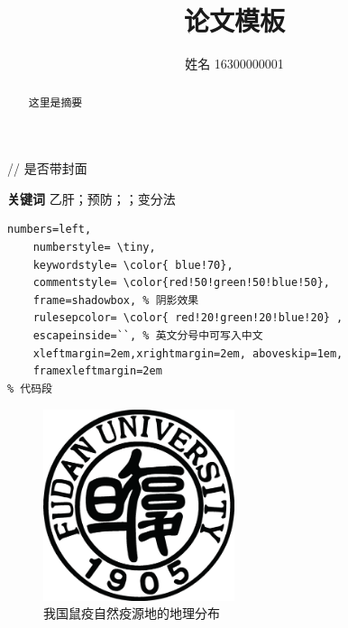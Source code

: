 \documentclass[UTF8,a4paper,12pt]{ctexart}%
\title{论文模板}
\author{姓名 16300000001}
\date{}
\begin{document}
	   // 是否带封面

\begin{abstract}
	这里是摘要
\end{abstract}
\noindent{}\textbf{关键词}\quad{} 乙肝；预防；；变分法

\tableofcontents %
\listoffigures%
\setcounter{page}{0}
\thispagestyle{empty}
\begin{lstlisting}[title=Myfile, frame=shadowbox]
 numbers=left, 
    numberstyle= \tiny, 
    keywordstyle= \color{ blue!70},
    commentstyle= \color{red!50!green!50!blue!50}, 
    frame=shadowbox, % 阴影效果
    rulesepcolor= \color{ red!20!green!20!blue!20} ,
    escapeinside=``, % 英文分号中可写入中文
    xleftmargin=2em,xrightmargin=2em, aboveskip=1em,
    framexleftmargin=2em
% 代码段
\end{lstlisting}

\begin{figure}[htb]
	\centering
	\includegraphics[width=0.5\textwidth]{xiaohui.eps}
		\caption{我国鼠疫自然疫源地的地理分布}
\label{fig:xiaohui}
\end{figure}
  
\end{document}

